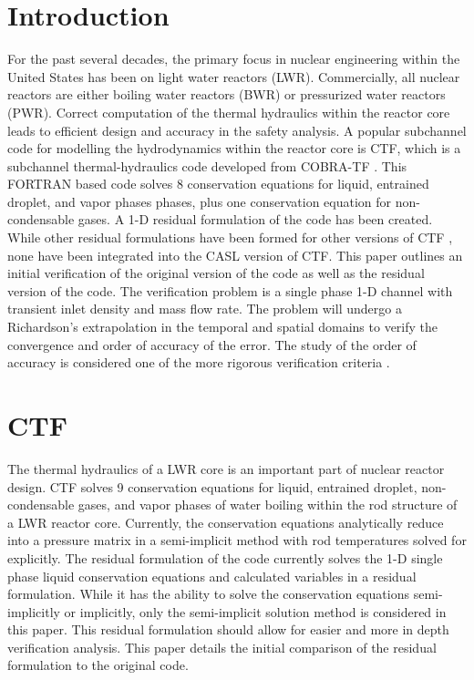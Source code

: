 \documentclass{mc2015}
\begin{document}
\clearpage

%

\section{Introduction}

For the past several decades, the primary focus in nuclear engineering within
the United States has been on light water reactors (LWR). Commercially,
all nuclear reactors are either boiling water reactors (BWR) or pressurized
water reactors (PWR). Correct computation of the thermal hydraulics within the
reactor core leads to efficient design and accuracy in the safety analysis. A
popular subchannel code for modelling the hydrodynamics within the reactor core
is CTF, which is a subchannel thermal-hydraulics code developed from
COBRA-TF \cite{Salko2014}. This FORTRAN based code solves 8 conservation
equations for liquid, entrained droplet, and vapor phases phases, plus one
conservation equation for non-condensable gases. A 1-D residual formulation of
the code has been created. While other residual formulations have been
formed for other versions of CTF \cite{Lloyd2014}, none have been integrated
into the CASL version of CTF. This paper outlines an initial verification of the original
version of the code as well as the residual version of the code. The verification problem is a single phase 1-D channel with transient inlet density and mass flow rate. The problem will undergo a Richardson's extrapolation in the
temporal and spatial domains to verify the convergence and order of accuracy of
the error. The study of the order of accuracy is considered one of the more
rigorous verification criteria \cite{Roy2005}.

\section{CTF}

The thermal hydraulics of a LWR core is an important part of nuclear
reactor design. CTF solves 9 conservation equations for liquid,
entrained droplet, non-condensable gases, and vapor phases of water boiling
within the rod structure of a LWR reactor core. Currently, the conservation
equations analytically reduce into a pressure matrix in a semi-implicit
method with rod temperatures solved for explicitly. The residual formulation of
the code currently solves the 1-D single phase liquid conservation equations and
calculated variables in a residual formulation. While it has the ability to
solve the conservation equations semi-implicitly or implicitly, only the
semi-implicit solution method is considered in this paper. This residual
formulation should allow for easier and more in depth verification  analysis.
This paper details the initial comparison of the residual  formulation to the original code.
\end{document}
